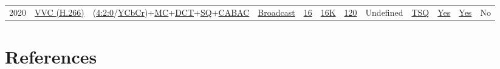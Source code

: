 \begin{tabular}{lrrrrrrrrrrr}
2020 & %
\href{https://en.wikipedia.org/wiki/Versatile_Video_Coding}{VVC (H.266)} & %
(\href{https://en.wikipedia.org/wiki/Chroma_subsampling#4:2:0}{4:2:0}/\href{https://en.wikipedia.org/wiki/JPEG#Color_space_transformation}{YCbCr})+\href{https://en.wikipedia.org/wiki/Motion_compensation}{MC}+\href{https://en.wikipedia.org/wiki/Discrete_cosine_transform}{DCT}+\href{https://en.wikipedia.org/wiki/Quantization_(signal_processing)}{SQ}+\href{https://en.wikipedia.org/wiki/Context-adaptive_variable-length_coding}{CABAC} & %
\href{https://en.wikipedia.org/wiki/Versatile_Video_Coding#Broadcast}{Broadcast} & %
\href{https://en.wikipedia.org/wiki/Versatile_Video_Coding#Concept}{16} & %
\href{https://en.wikipedia.org/wiki/16K_resolution}{16K} & %
\href{https://en.wikipedia.org/wiki/Versatile_Video_Coding#Concept}{120} & %
Undefined & %
\href{https://en.wikipedia.org/wiki/Versatile_Video_Coding#Concept}{TSQ} & %
\href{https://en.wikipedia.org/wiki/Versatile_Video_Coding#Concept}{Yes} & %
\href{https://en.wikipedia.org/wiki/Versatile_Video_Coding#Concept}{Yes} & %
No \\ %

\end{tabular}

\section{References}

\renewcommand{\addcontentsline}[3]{}%


